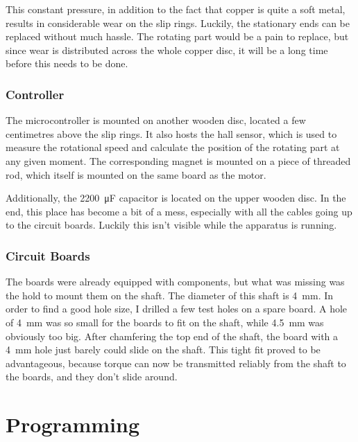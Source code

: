 \documentclass[a4paper, 11pt, titlepage]{report}
\begin{document}
This constant pressure, in addition to the fact that copper is quite a soft metal, results in 
considerable wear on the slip rings. Luckily, the stationary ends can be replaced without much 
hassle. The rotating part would be a pain to replace, but since wear is distributed across the 
whole copper disc, it will be a long time before this needs to be done.


\subsection{Controller}

The microcontroller is mounted on another wooden disc, located a few centimetres above the slip
rings. It also hosts the hall sensor, which is used to measure the rotational speed and calculate
the position of the rotating part at any given moment. The corresponding magnet is mounted on a 
piece of threaded rod, which itself is mounted on the same board as the motor.

Additionally, the \SI{2200}{\micro\farad} capacitor is located on the upper wooden disc. In the 
end, this place has become a bit of a mess, especially with all the cables going up to the circuit 
boards. Luckily this isn't visible while the apparatus is running. 


\subsection{Circuit Boards}

The boards were already equipped with components, but what was missing was the hold to mount them
on the shaft. The diameter of this shaft is \SI{4}{\milli\meter}. In order to find a good hole 
size, I drilled a few test holes on a spare board. A hole of \SI{4}{\milli\meter} was so small for
the boards to fit on the shaft, while \SI{4.5}{\milli\meter} was obviously too big. After 
chamfering the top end of the shaft, the board with a \SI{4}{\milli\meter} hole just barely could
slide on the shaft. This tight fit proved to be advantageous, because torque can now be transmitted
reliably from the shaft to the boards, and they don't slide around.


\chapter{Programming}
\end{document}
